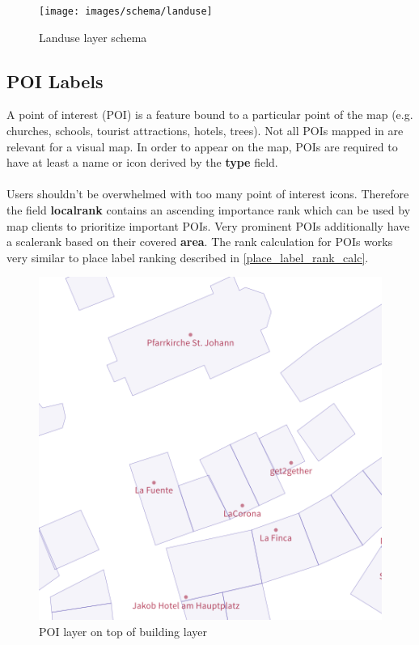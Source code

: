 \begin{figure}[H]
  \centering
  \texttt{[image: images/schema/landuse]}
  \caption{Landuse layer schema}
\end{figure}

\subsection{POI Labels}

\noindent\begin{minipage}[t]{0.48\linewidth}
    \vspace{0pt}
    A point of interest (POI) is a feature bound to a particular point of the map (e.g. churches, schools, tourist attractions, hotels, trees).
    Not all POIs mapped in \osm{} are relevant for a visual map. In order to appear on the map, POIs are required to have at least a name or icon derived by the \textbf{type} field.
    \\\\
    Users shouldn't be overwhelmed with too many point of interest icons. Therefore the field \textbf{localrank} contains an ascending importance rank which can be used by map clients to prioritize important POIs. Very prominent POIs additionally have a scalerank based on their covered \textbf{area}. The rank calculation for POIs works very similar to place label ranking described in \autoref{place_label_rank_calc}.
\end{minipage}
\hfill
\begin{minipage}[t]{0.48\linewidth}
    \vspace{0pt}
    \begin{figure}[H]
        \includegraphics[width=\textwidth]{images/schema/poi_label_example}
        \caption{POI layer on top of building layer}
    \end{figure}
\end{minipage}
